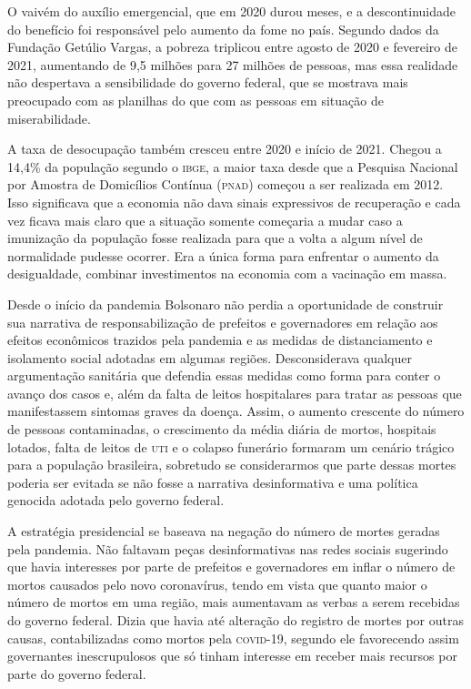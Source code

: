 O vaivém do auxílio emergencial, que em 2020 durou meses, e a
descontinuidade do benefício foi responsável pelo aumento da fome no
país. Segundo dados da Fundação Getúlio Vargas, a pobreza triplicou
entre agosto de 2020 e fevereiro de 2021, aumentando de 9,5 milhões para
27 milhões de pessoas, mas essa realidade não despertava a sensibilidade
do governo federal, que se mostrava mais preocupado com as planilhas do
que com as pessoas em situação de miserabilidade.

A taxa de desocupação também cresceu entre 2020 e início de 2021. Chegou
a 14,4\% da população segundo o \textsc{ibge}, a maior taxa desde que a Pesquisa
Nacional por Amostra de Domicílios Contínua (\textsc{pnad}) começou a ser
realizada em 2012. Isso significava que a economia não dava sinais
expressivos de recuperação e cada vez ficava mais claro que a situação
somente começaria a mudar caso a imunização da população fosse realizada
para que a volta a algum nível de normalidade pudesse ocorrer. Era a
única forma para enfrentar o aumento da desigualdade, combinar
investimentos na economia com a vacinação em massa.

Desde o início da pandemia Bolsonaro não perdia a oportunidade de
construir sua narrativa de responsabilização de prefeitos e governadores
em relação aos efeitos econômicos trazidos pela pandemia e as medidas de
distanciamento e isolamento social adotadas em algumas regiões.
Desconsiderava qualquer argumentação sanitária que defendia essas
medidas como forma para conter o avanço dos casos e, além da falta de
leitos hospitalares para tratar as pessoas que manifestassem sintomas
graves da doença. Assim, o aumento crescente do número de pessoas
contaminadas, o crescimento da média diária de mortos, hospitais
lotados, falta de leitos de \textsc{uti} e o colapso funerário formaram um
cenário trágico para a população brasileira, sobretudo se considerarmos
que parte dessas mortes poderia ser evitada se não fosse a narrativa
desinformativa e uma política genocida adotada pelo governo federal.

A estratégia presidencial se baseava na negação do número de mortes
geradas pela pandemia. Não faltavam peças desinformativas nas redes
sociais sugerindo que havia interesses por parte de prefeitos e
governadores em inflar o número de mortos causados pelo novo
coronavírus, tendo em vista que quanto maior o número de mortos em uma
região, mais aumentavam as verbas a serem recebidas do governo federal.
Dizia que havia até alteração do registro de mortes por outras causas,
contabilizadas como mortos pela \textsc{covid-19}, segundo ele favorecendo assim
governantes inescrupulosos que só tinham interesse em receber mais
recursos por parte do governo federal.

